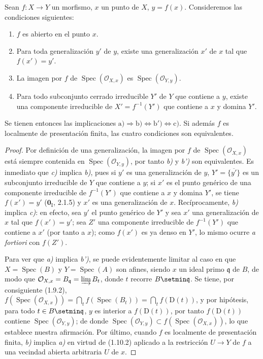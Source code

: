 \begin{proposition}[1.10.3]
Sean $f:X\to Y$ un morfismo, $x$ un punto de $X$, $y=f(x)$. Consideremos
las condiciones siguientes:
\begin{enumerate}
  \item[\textup{a)}] $f$ es abierto en el punto $x$.
  \item[\textup{b)}] Para toda generalización $y'$ de $y$, existe una generalización
  $x'$ de $x$ tal que $f(x')=y'$.
  \item[\textup{b')}] La imagen por $f$ de $\operatorname{Spec}(\mathcal O_{X,x})$ es
  $\operatorname{Spec}(\mathcal O_{Y,y})$.
  \item[\textup{c)}] Para todo subconjunto cerrado irreducible $Y'$ de $Y$ que contiene a $y$,
  existe una componente irreducible de $X'=f^{-1}(Y')$ que contiene a $x$ y
  domina $Y'$.
\end{enumerate}
Se tienen entonces las implicaciones
$\mathrm{a)}\Rightarrow\mathrm{b)}\Leftrightarrow\mathrm{b')}
\Leftrightarrow\mathrm{c)}$. Si además $f$ es localmente de presentación
finita, las cuatro condiciones son equivalentes.
\end{proposition}

\begin{proof}
Por definición de una generalización, la imagen por $f$ de
$\operatorname{Spec}(\mathcal O_{X,x})$ está siempre contenida en
$\operatorname{Spec}(\mathcal O_{Y,y})$, por tanto \emph{b)} y \emph{b')} son equivalentes. Es
inmediato
que \emph{c)} implica \emph{b)}, pues si $y'$ es una generalización de $y$,
$Y'=\overline{\{y'\}}$ es un subconjunto irreducible de $Y$ que contiene a $y$; si
$x'$ es el punto genérico de una componente irreducible de $f^{-1}(Y')$ que
contiene a $x$ y domina $Y'$, se tiene $f(x')=y'$ ($\mathbf{0}_{\mathrm I}$, 2.1.5) y $x'$
es una generalización de $x$. Recíprocamente, \emph{b)} implica \emph{c)}: en efecto, sea
$y'$ el punto genérico de $Y'$ y sea $x'$ una generalización de $x$ tal
que $f(x')=y'$; sea $Z'$ una componente irreducible de $f^{-1}(Y')$
que contiene a $x'$ (por tanto a $x$); como $f(x')$ es ya denso en $Y'$, lo mismo
ocurre \emph{a fortiori} con $f(Z')$.

Para ver que \emph{a)} implica \emph{b')}, se puede evidentemente limitar al caso en que
$X=\operatorname{Spec}(B)$ y $Y=\operatorname{Spec}(A)$ son afines, siendo $x$
un ideal primo
$\mathfrak q$ de $B$, de modo que
$\mathcal O_{X,x}=B_{\mathfrak q}=\varinjlim B_t$,
donde $t$ recorre $B\setmin\mathfrak q$. Se tiene, por consiguiente (1.9.2),
$f(\operatorname{Spec}(\mathcal O_{X,x}))
=\bigcap_t f(\operatorname{Spec}(B_t))=\bigcap_t f(\mathrm D(t))$,
y por hipótesis, para todo $t\in B\setmin\mathfrak q$, $y$ es interior a
$f(\mathrm D(t))$, por tanto $f(\mathrm D(t))$ contiene
$\operatorname{Spec}(\mathcal O_{Y,y})$; de donde
$\operatorname{Spec}(\mathcal O_{Y,y})
\subset f(\operatorname{Spec}(\mathcal O_{X,x}))$, lo que establece
nuestra afirmación. Por último, cuando $f$ es localmente de presentación finita, \emph{b)}
implica \emph{a)} en virtud de (1.10.2) aplicado a la restricción $U\to Y$ de $f$ a
una vecindad abierta arbitraria $U$ de $x$.
\end{proof}

